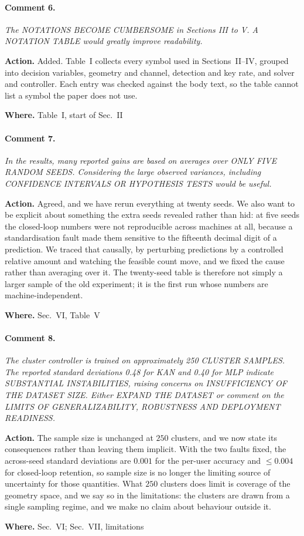 \documentclass[10pt]{article}
\newcommand{\rev}[1]{\par\medskip\noindent\textit{#1}\par\smallskip}
\newcommand{\act}[2]{\noindent\textbf{Action.} #1\par\noindent\textbf{Where.} #2\par}
\begin{document}
\paragraph{Comment 6.}
\rev{The NOTATIONS BECOME CUMBERSOME in Sections III to V. A NOTATION TABLE would greatly improve readability.}
\act{Added. Table~I collects every symbol used in Sections~II--IV, grouped into decision variables, geometry and channel, detection and key rate, and solver and controller. Each entry was checked against the body text, so the table cannot list a symbol the paper does not use.}{Table~I, start of Sec.~II}

\paragraph{Comment 7.}
\rev{In the results, many reported gains are based on averages over ONLY FIVE RANDOM SEEDS. Considering the large observed variances, including CONFIDENCE INTERVALS OR HYPOTHESIS TESTS would be useful.}
\act{Agreed, and we have rerun everything at twenty seeds. We also want to be explicit about something the extra seeds revealed rather than hid: at five seeds the closed-loop numbers were not reproducible across machines at all, because a standardisation fault made them sensitive to the fifteenth decimal digit of a prediction. We traced that causally, by perturbing predictions by a controlled relative amount and watching the feasible count move, and we fixed the cause rather than averaging over it. The twenty-seed table is therefore not simply a larger sample of the old experiment; it is the first run whose numbers are machine-independent.}{Sec.~VI, Table~V}

\paragraph{Comment 8.}
\rev{The cluster controller is trained on approximately 250 CLUSTER SAMPLES. The reported standard deviations 0.48 for KAN and 0.40 for MLP indicate SUBSTANTIAL INSTABILITIES, raising concerns on INSUFFICIENCY OF THE DATASET SIZE. Either EXPAND THE DATASET or comment on the LIMITS OF GENERALIZABILITY, ROBUSTNESS AND DEPLOYMENT READINESS.}
\act{The sample size is unchanged at $250$ clusters, and we now state its consequences rather than leaving them implicit. With the two faults fixed, the across-seed standard deviations are $0.001$ for the per-user accuracy and $\le 0.004$ for closed-loop retention, so sample size is no longer the limiting source of uncertainty for those quantities. What $250$ clusters does limit is coverage of the geometry space, and we say so in the limitations: the clusters are drawn from a single sampling regime, and we make no claim about behaviour outside it.}{Sec.~VI; Sec.~VII, limitations}
\end{document}
